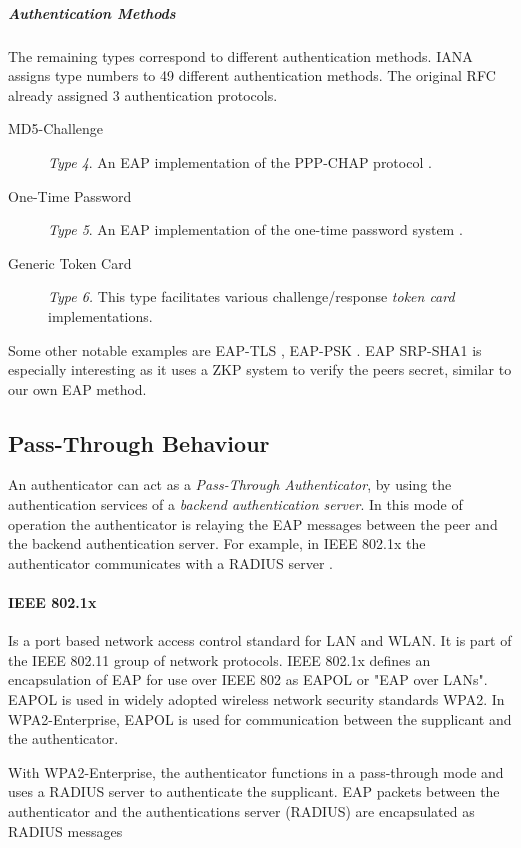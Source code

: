 \subparagraph{Authentication Methods}
The remaining types correspond to different authentication methods.
IANA \cite{joseph2004eap} assigns type numbers to 49 different authentication methods.
The original RFC \cite{aboba2004extensible} already assigned 3 authentication protocols.

\begin{description}
	\item[MD5-Challenge] \textit{Type 4}. An EAP implementation of the PPP-CHAP protocol \cite{simon2008eap}.
	\item[One-Time Password] \textit{Type 5}. An EAP implementation of the one-time password system \cite{haller1998one}.
	\item[Generic Token Card] \textit{Type 6.} This type facilitates various challenge/response \textit{token card} implementations.
\end{description}

Some other notable examples are EAP-TLS \cite{simon2008eap}, EAP-PSK \cite{bersani2007eap}.
EAP SRP-SHA1 \cite{ietf-pppext-eap-srp-03} is especially interesting as it uses a ZKP system to verify the peers secret, similar to our own EAP method.

\subsection{Pass-Through Behaviour}
An authenticator can act as a \textit{Pass-Through Authenticator}, by using the authentication services of a \textit{backend authentication server}.
In this mode of operation the authenticator is relaying the EAP messages between the peer and the backend authentication server.
For example, in IEEE 802.1x the authenticator communicates with a RADIUS server \cite{congdon2003ieee}.

\paragraph{IEEE 802.1x}

Is a port based network access control standard for LAN and WLAN.
It is part of the IEEE 802.11 group of network protocols.
IEEE 802.1x defines an encapsulation of EAP for use over IEEE 802 as EAPOL or "EAP over LANs".
EAPOL is used in widely adopted wireless network security standards WPA2. 
In WPA2-Enterprise, EAPOL is used for communication between the supplicant and the authenticator.

With WPA2-Enterprise, the authenticator functions in a pass-through mode and uses a RADIUS server to authenticate the supplicant.
EAP packets between the authenticator and the authentications server (RADIUS) are encapsulated as RADIUS messages \cite{aboba2003radius, chen2005extensible, congdon2003ieee}


